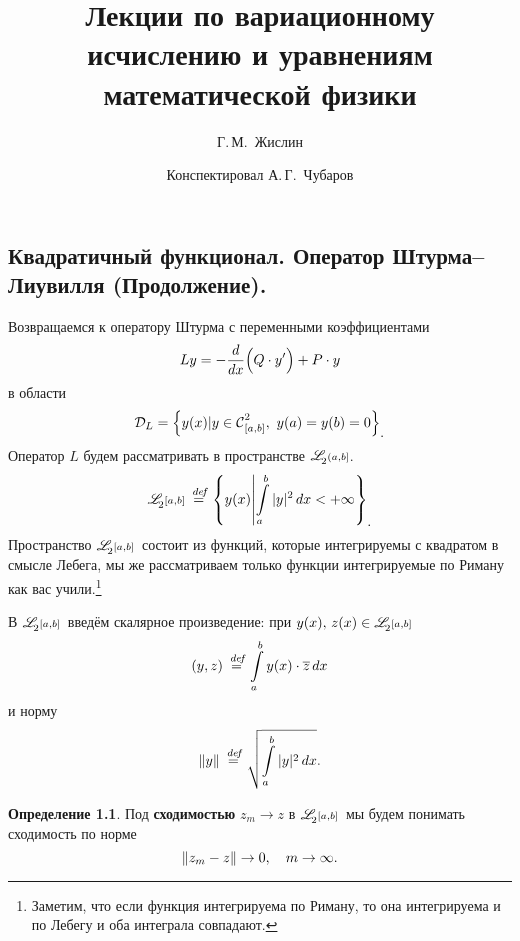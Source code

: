 \documentclass[12pt,a4paper,openany,fleqn]{book}
\newcommand {\defeq}{\stackrel{\hspace{0.09 cm}de\!f}{=}}
\newcommand {\eqdef}{\defeq}
\newcommand{\Cf}{\ensuremath{\mathcal{C}}}
\newcommand{\mc}[1]{\ensuremath{\mathcal{#1}}}
\newcommand{\Cfn}[2][]{\ensuremath{\Cf{\mathstrut}^{#2}_{#1}}}
\newcommand{\der}[2]{\ensuremath{\frac{d#1}{d#2}}}
\newcommand{\LL}{\ensuremath{L}}
\newcommand{\fL}[1][{[a,b]}]{\ensuremath{\mathscr{L}\hspace*{-0.11 cm}{\mathstrut}_{2}{\scriptstyle#1}}}
\newcommand{\norm}[1]{\ensuremath{\|#1\|}}
\theoremstyle{definition}
\newtheorem{_def}{Определение}[section]
\begin{document}
	\author{Г.\,М.~Жислин}
	\title{Лекции по вариационному исчислению и уравнениям математической физики}
	\date{Конспектировал А.\,Г.~Чубаров}
	
	
	
	\maketitle
	
	
	\renewcommand{\thepart}{\Asbuk{part}}
	\renewcommand{\thechapter}{\arabic{chapter}}
	\renewcommand{\thesection}{\arabic{section}}
	\renewcommand{\thesubsection}{\Roman{subsection}}
	\renewcommand{\thefootnote}{\roman{footnote}}
	\renewcommand{\phi}{\varphi}
	\renewcommand{\Re}{\ensuremath{\mc{R}e\,}}
	\renewcommand{\Im}{\ensuremath{\mc{I}m\,}}
	
	\setcounter{chapter}{4}
	\chapter{}
	\label{lecture5}
	\section[Квадратичный функционал. Оператор Штурма (Продолжение). ]{Квадратичный функционал. Оператор Штурма--Лиувилля (Продолжение).}
	\label{lecture5section1}
	Возвращаемся к оператору Штурма с переменными коэффициентами
	\begin{equation}
		\label{l5:eq:1}
		\hfill \LL{}y=-\der{}{x}\Big(Q\cdot y'\Big)+P\cdot y\hfill
	\end{equation}
в области 
\begin{equation*}
		\hfill\mc{D}_{\LL}=\left\{y(x)|y\in\Cfn[{[a,b]}]{2},\ y(a)=y(b)=0\right\}_{\displaystyle.}\hfill
\end{equation*}
Оператор $\LL$ будем рассматривать в пространстве $\fL[{(a,b]}]$.
\begin{equation*}
	\hfill \fL\eqdef\left\{y(x)\middle|\int\limits_a^b|y|^2\,dx<+\infty\right\}_{\displaystyle.}\hfill
\end{equation*}
Пространство \fL\ состоит из функций, которые интегрируемы с квадратом в смысле Лебега, мы же рассматриваем только функции интегрируемые по Риману как вас учили.\footnote[1]{Заметим, что если функция интегрируема по Риману, то она интегрируема и по Лебегу и оба интеграла совпадают.}

В \fL\ введём скалярное произведение: при $y(x),\,z(x)\in\fL$
\begin{equation*}
	\hfill(y,z)\eqdef\int\limits_a^b y(x)\cdot \overline{z}\,dx\hfill
\end{equation*}  
и норму
\begin{equation*}
	\hfill\norm{y}\eqdef\sqrt{\int\limits_a^b|y|^2\,dx}.\hfill
\end{equation*}
\begin{_def}
Под \textbf{сходимостью} $z_{m}\to z$ в \fL\ мы будем понимать сходимость по норме
\begin{equation*}
	\hfill\norm{z_m-z}\to0,\quad m\to\infty.\hfill
\end{equation*}
\end{_def}
\end{document}
